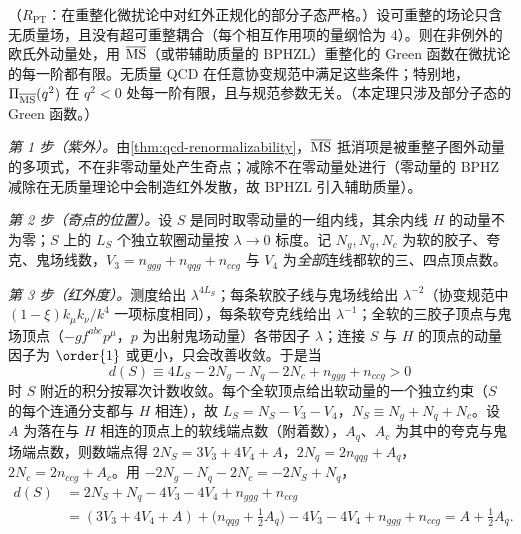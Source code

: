 \begin{theorem}\label{thm:ee-euclid-ir}
（$R_{\mathrm{PT}}$：在重整化微扰论中对红外正规化的部分子态严格。）设可重整的场论只含无质量场，且没有超可重整耦合（每个相互作用项的量纲恰为 $4$）。则在非例外的欧氏外动量处，用 $\overline{\rm MS}$（或带辅助质量的 BPHZL）重整化的 Green 函数在微扰论的每一阶都有限。无质量 QCD 在任意协变规范中满足这些条件；特别地，$\Pi_{\overline{\rm MS}}(q^2)$ 在 $q^2<0$ 处每一阶有限，且与规范参数无关。（本定理只涉及部分子态的 Green 函数。）
\end{theorem}
\begin{proofsketch}
\emph{第 1 步（紫外）。}由\cref{thm:qcd-renormalizability}，$\overline{\rm MS}$ 抵消项是被重整子图外动量的多项式，不在非零动量处产生奇点；减除不在零动量处进行（零动量的 BPHZ 减除在无质量理论中会制造红外发散，故 BPHZL 引入辅助质量\cite{LowensteinZimmermann1975}）。

\emph{第 2 步（奇点的位置）。}设 $S$ 是同时取零动量的一组内线，其余内线 $H$ 的动量不为零；$S$ 上的 $L_S$ 个独立软圈动量按 $\lambda\to0$ 标度。记 $N_g,N_q,N_c$ 为软的胶子、夸克、鬼场线数，$V_3=n_{ggg}+n_{qqg}+n_{ccg}$ 与 $V_4$ 为\emph{全部}连线都软的三、四点顶点数。

\emph{第 3 步（红外度）。}测度给出 $\lambda^{4L_S}$；每条软胶子线与鬼场线给出 $\lambda^{-2}$（协变规范中 $(1-\xi)k_\mu k_\nu/k^4$ 一项标度相同），每条软夸克线给出 $\lambda^{-1}$；全软的三胶子顶点与鬼场顶点（$-gf^{abc}p^\mu$，$p$ 为出射鬼场动量）各带因子 $\lambda$；连接 $S$ 与 $H$ 的顶点的动量因子为 $\order{1}$ 或更小，只会改善收敛。于是当
\begin{equation}\label{eq:ee-irdeg}
d(S)\equiv4L_S-2N_g-N_q-2N_c+n_{ggg}+n_{ccg}>0
\end{equation}
时 $S$ 附近的积分按幂次计数收敛。每个全软顶点给出软动量的一个独立约束（$S$ 的每个连通分支都与 $H$ 相连），故 $L_S=N_S-V_3-V_4$，$N_S\equiv N_g+N_q+N_c$。设 $A$ 为落在与 $H$ 相连的顶点上的软线端点数（附着数），$A_q$、$A_c$ 为其中的夸克与鬼场端点数，则数端点得 $2N_S=3V_3+4V_4+A$，$2N_q=2n_{qqg}+A_q$，$2N_c=2n_{ccg}+A_c$。用 $-2N_g-N_q-2N_c=-2N_S+N_q$，
\begin{equation}\label{eq:ee-irdeg2}
\begin{split}
d(S)&=2N_S+N_q-4V_3-4V_4+n_{ggg}+n_{ccg}\\
&=(3V_3+4V_4+A)+\big(n_{qqg}+\tfrac12A_q\big)-4V_3-4V_4+n_{ggg}+n_{ccg}=A+\tfrac12A_q .
\end{split}
\end{equation}


\end{proofsketch}
